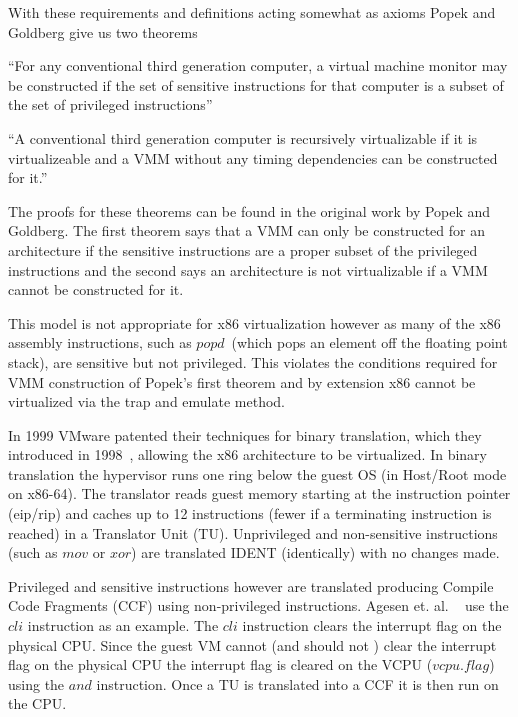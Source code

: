 With these requirements and definitions acting somewhat as axioms Popek and Goldberg give us two theorems ~\cite{popek_formal_1974}



 \begin{theorem}
 \label{Popek I}
 {
 ``For any conventional third generation computer, a virtual machine monitor may be constructed if the set of sensitive instructions for that computer is a subset of the set of privileged instructions'' ~\cite{popek_formal_1974}
 }
 \end{theorem}


\begin{theorem}
 \label{Popek II}
 {
 ``A conventional third generation computer is recursively virtualizable if it is virtualizeable and a VMM without any timing dependencies can be constructed for it.'' ~\cite{popek_formal_1974}
 }
 \end{theorem}



The proofs for these theorems can be found in the original work by Popek and Goldberg. The first theorem says that a VMM can only be constructed for an architecture if the sensitive instructions are a proper subset of the privileged instructions and the second says an architecture is not virtualizable if a VMM cannot be constructed for it.  

This model is not appropriate for x86 virtualization however as many of the x86 assembly instructions, such as $popd$~\cite{_intel_2015}(which pops an element off the floating point stack),  are sensitive but not privileged. This violates the conditions required for VMM construction of Popek's first theorem and by extension x86 cannot be virtualized via the trap and emulate method. 

In 1999 VMware patented their techniques for binary translation, which they introduced in 1998~\cite{rosenblum_vmwareas_1999}, allowing the x86 architecture to be virtualized.  In binary translation the hypervisor runs one ring below the guest OS (in Host/Root mode on x86-64).  The translator reads guest memory starting at the instruction pointer (eip/rip) and caches up to 12 instructions (fewer if a terminating instruction is reached) in a Translator Unit (TU). Unprivileged and non-sensitive instructions (such as $mov$ or $xor$) are translated IDENT (identically) with no changes made. 

Privileged and sensitive instructions however are translated producing Compile Code Fragments (CCF) using non-privileged instructions. Agesen et. al. ~\cite{agesen_evolution_2010} use the $cli$ instruction as an example. The $cli$ instruction clears the interrupt flag on the physical CPU. 
Since the guest VM cannot (and should not ) clear the interrupt flag on the physical CPU the interrupt flag is cleared on the VCPU ($vcpu.flag$) using the $and$ instruction. Once a TU is translated into a CCF it is then run on the CPU. 


